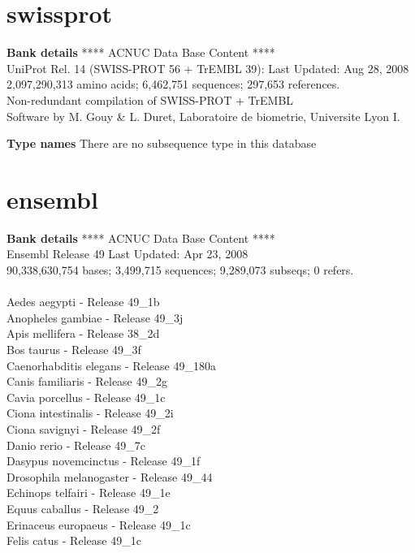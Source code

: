 \documentclass{article}
\begin{document}
\begin{Schunk}
\section{ swissprot }
\textbf{Bank details}
               ****     ACNUC Data Base Content      ****                       \\
    UniProt Rel. 14 (SWISS-PROT 56 + TrEMBL 39): Last Updated: Aug 28, 2008\\
          2,097,290,313 amino acids; 6,462,751 sequences; 297,653 references.\\
          Non-redundant compilation of SWISS-PROT + TrEMBL\\
Software by M. Gouy \& L. Duret, Laboratoire de biometrie, Universite Lyon I.

\textbf{Type names}
There are no subsequence type in this database
\section{ ensembl }
\textbf{Bank details}
             ****     ACNUC Data Base Content      ****\\
             Ensembl Release 49	     		 Last Updated: Apr 23, 2008\\
90,338,630,754 bases; 3,499,715 sequences; 9,289,073 subseqs; 0 refers.\\
\\
 Aedes aegypti - Release 49\_1b \\
 Anopheles gambiae - Release 49\_3j \\
 Apis mellifera - Release 38\_2d \\
 Bos taurus - Release 49\_3f \\
 Caenorhabditis elegans - Release 49\_180a \\
 Canis familiaris - Release 49\_2g \\
 Cavia porcellus - Release 49\_1c \\
 Ciona intestinalis - Release 49\_2i \\
 Ciona savignyi - Release 49\_2f \\
 Danio rerio - Release 49\_7c \\
 Dasypus novemcinctus - Release 49\_1f \\
 Drosophila melanogaster - Release 49\_44 \\
 Echinops telfairi - Release 49\_1e \\
 Equus caballus - Release 49\_2 \\
 Erinaceus europaeus - Release 49\_1c \\
 Felis catus - Release 49\_1c \\

\end{Schunk}
\end{document}

